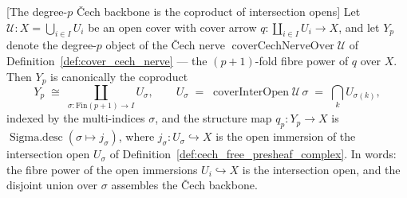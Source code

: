 \begin{lemma}

[The degree-\(p\) {\v C}ech backbone is the coproduct of intersection opens]
  \label{lem:cech_backbone_left_sigma}
  Let \(\mathcal{U} : X = \bigcup_{i \in I} U_i\) be an open cover with cover arrow
  \(q : \coprod_{i \in I} U_i \to X\), and let \(Y_p\) denote the degree-\(p\) object of the
  {\v C}ech nerve \(\operatorname{coverCechNerveOver}\mathcal{U}\) of
  Definition~\ref{def:cover_cech_nerve} --- the \((p+1)\)-fold fibre power of \(q\) over
  \(X\). Then \(Y_p\) is canonically the coproduct
  \[
    Y_p \;\cong\; \coprod_{\sigma : \mathrm{Fin}(p+1) \to I} U_\sigma,
    \qquad
    U_\sigma \;=\; \operatorname{coverInterOpen}\mathcal{U}\,\sigma \;=\;
      \bigcap_{k} U_{\sigma(k)},
  \]
  indexed by the multi-indices \(\sigma\), and the structure map \(q_p : Y_p \to X\) is
  \(\operatorname{Sigma.desc}(\sigma \mapsto j_\sigma)\), where
  \(j_\sigma : U_\sigma \hookrightarrow X\) is the open immersion of the intersection open
  \(U_\sigma\) of Definition~\ref{def:cech_free_presheaf_complex}. In words: the fibre power
  of the open immersions \(U_i \hookrightarrow X\) is the intersection open, and the disjoint
  union over \(\sigma\) assembles the {\v C}ech backbone.
\end{lemma}
